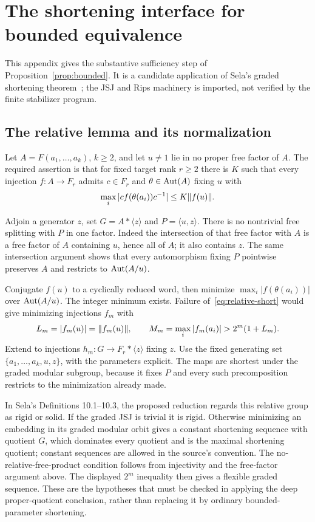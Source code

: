 \section{The shortening interface for bounded equivalence}\label{app:shortening}

This appendix gives the substantive sufficiency step of
Proposition~\ref{prop:bounded}. It is a candidate application of Sela's
graded shortening theorem~\cite{sela}; the JSJ and Rips machinery is
imported, not verified by the finite stabilizer program.

\subsection{The relative lemma and its normalization}
Let $A=F(a_1,\ldots,a_k)$, $k\ge2$, and let $u\ne1$ lie in no
proper free factor of $A$. The required assertion is that for fixed
target rank $r\ge2$ there is $K$ such that every injection
$f:A\to F_r$ admits $c\in F_r$ and $\theta\in\operatorname{Aut}(A)$ fixing
$u$ with
\begin{equation}\label{eq:relative-short}
 \max_i|cf(\theta(a_i))c^{-1}|\le K\lVert f(u)\rVert.
\end{equation}

Adjoin a generator $z$, set $G=A*\langle z\rangle$ and
$P=\langle u,z\rangle$. There is no nontrivial free splitting with
$P$ in one factor. Indeed the intersection of that free factor with
$A$ is a free factor of $A$ containing $u$, hence all of $A$; it
also contains $z$. The same intersection argument shows that every
automorphism fixing $P$ pointwise preserves $A$ and restricts to
$\operatorname{Aut}(A/u)$.

Conjugate $f(u)$ to a cyclically reduced word, then minimize
$\max_i|f(\theta(a_i))|$ over $\operatorname{Aut}(A/u)$. The integer minimum
exists. Failure of~\eqref{eq:relative-short} would give minimizing
injections $f_m$ with
\[
 L_m=|f_m(u)|=\clen{f_m(u)},\qquad
 M_m=\max_i|f_m(a_i)|>2^m(1+L_m).
\]
Extend to injections $h_m:G\to F_r*\langle z\rangle$ fixing $z$.
Use the fixed generating set $\{a_1,\ldots,a_k,u,z\}$, with the
parameters explicit. The maps are shortest under the graded modular
subgroup, because it fixes $P$ and every such precomposition restricts
to the minimization already made.

In Sela's Definitions 10.1--10.3, the proposed reduction regards this
relative group as rigid or solid. If the graded JSJ is trivial it is
rigid. Otherwise minimizing an embedding in its graded modular orbit
gives a constant shortening sequence with quotient $G$, which dominates
every quotient and is the maximal shortening quotient; constant
sequences are allowed in the source's convention. The no-relative-free-product
condition follows from injectivity and the free-factor argument above.
The displayed $2^m$ inequality then gives a flexible graded sequence.
These are the hypotheses that must be checked in applying the deep
proper-quotient conclusion, rather than replacing it by ordinary
bounded-parameter shortening.

